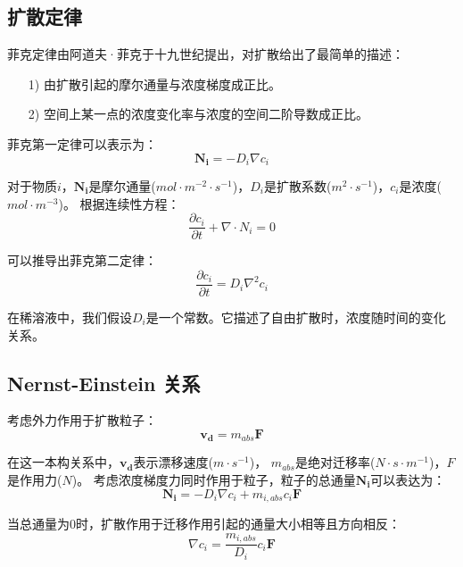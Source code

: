 \subsection{扩散定律}
菲克定律由阿道夫·菲克于十九世纪提出，对扩散给出了最简单的描述：
\begin{itemize}[leftmargin=40pt]
    \item [1)]由扩散引起的摩尔通量与浓度梯度成正比。
    \item [2)]空间上某一点的浓度变化率与浓度的空间二阶导数成正比。
\end{itemize}

菲克第一定律可以表示为：
\begin{equation}
    \mathbf{N_i}=-D_i\nabla{c_i}
\end{equation}

对于物质$i$，$\mathbf{N_i}$是摩尔通量($mol\cdot{m^{-2}\cdot{s^{-1}}}$)，$D_i$是扩散系数($m^2\cdot{s^{-1}}$)，$c_i$是浓度($mol\cdot{m^{-3}}$)。
根据连续性方程：
\begin{equation}
    \frac{\partial c_i}{\partial t}+\nabla\cdot{N_i}=0
\end{equation}

可以推导出菲克第二定律：
\begin{equation}
    \frac{\partial c_i}{\partial t}=D_i\nabla^2{c_i}
\end{equation}

在稀溶液中，我们假设$D_i$是一个常数。它描述了自由扩散时，浓度随时间的变化关系。\cite{Sakaguchi2018} 
\subsection{Nernst-Einstein 关系}
考虑外力作用于扩散粒子：
\begin{equation}
    \mathbf{v_d}=m_{abs}\mathbf{F}
\end{equation}

在这一本构关系中，$\mathbf{v_d}$表示漂移速度($m\cdot{s^{-1}}$)，
$m_{abs}$是绝对迁移率($N\cdot{s\cdot{m^{-1}}}$)，$F$是作用力($N$)。
考虑浓度梯度力同时作用于粒子，粒子的总通量$\mathbf{N_i}$可以表达为：
\begin{equation}
    \mathbf{N_i}=-D_i\nabla{c_i}+m_{i,abs}c_i\mathbf{F}
\end{equation}

当总通量为$0$时，扩散作用于迁移作用引起的通量大小相等且方向相反：
\begin{equation}
    \nabla{c_i}=\frac{m_{i,abs}}{D_i}c_i\mathbf{F}
\end{equation}

